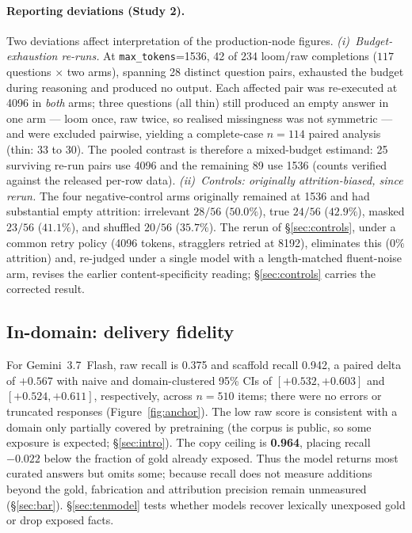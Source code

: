 \documentclass[10pt,twocolumn]{article}
\begin{document}
\paragraph{Reporting deviations (Study 2).} Two deviations affect interpretation of the production-node figures. \emph{(i)~Budget-exhaustion re-runs.} At \texttt{max\_tokens}=1536, 42 of 234 loom/raw completions ($117$ questions $\times$ two arms), spanning 28 distinct question pairs, exhausted the budget during reasoning and produced no output. Each affected pair was re-executed at 4096 in \emph{both} arms; three questions (all thin) still produced an empty answer in one arm --- loom once, raw twice, so realised missingness was not symmetric --- and were excluded pairwise, yielding a complete-case $n=114$ paired analysis (thin: 33 to 30). The pooled contrast is therefore a mixed-budget estimand: 25 surviving re-run pairs use 4096 and the remaining 89 use 1536 (counts verified against the released per-row data). \emph{(ii)~Controls: originally attrition-biased, since rerun.} The four negative-control arms originally remained at 1536 and had substantial empty attrition: irrelevant $28/56$ ($50.0\%$), true $24/56$ ($42.9\%$), masked $23/56$ ($41.1\%$), and shuffled $20/56$ ($35.7\%$). The rerun of \S\ref{sec:controls}, under a common retry policy (4096 tokens, stragglers retried at 8192), eliminates this ($0\%$ attrition) and, re-judged under a single model with a length-matched fluent-noise arm, revises the earlier content-specificity reading; \S\ref{sec:controls} carries the corrected result.

\subsection{In-domain: delivery fidelity}\label{sec:indomain}
For Gemini~3.7~Flash, raw recall is 0.375 and scaffold recall 0.942, a paired delta of $\mathbf{+0.567}$ with naive and domain-clustered 95\% CIs of $[+0.532,+0.603]$ and $[+0.524,+0.611]$, respectively, across $n=510$ items; there were no errors or truncated responses (Figure~\ref{fig:anchor}). The low raw score is consistent with a domain only partially covered by pretraining (the corpus is public, so some exposure is expected; \S\ref{sec:intro}). The copy ceiling is \textbf{0.964}, placing recall $-0.022$ below the fraction of gold already exposed. Thus the model returns most curated answers but omits some; because recall does not measure additions beyond the gold, fabrication and attribution precision remain unmeasured (\S\ref{sec:bar}). \S\ref{sec:tenmodel} tests whether models recover lexically unexposed gold or drop exposed facts.
\end{document}
